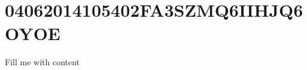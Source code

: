 \documentclass{article}
\begin{document}
\section{04062014105402FA3SZMQ6IIHJQ6OYOE}
Fill me with content
\end{document}
